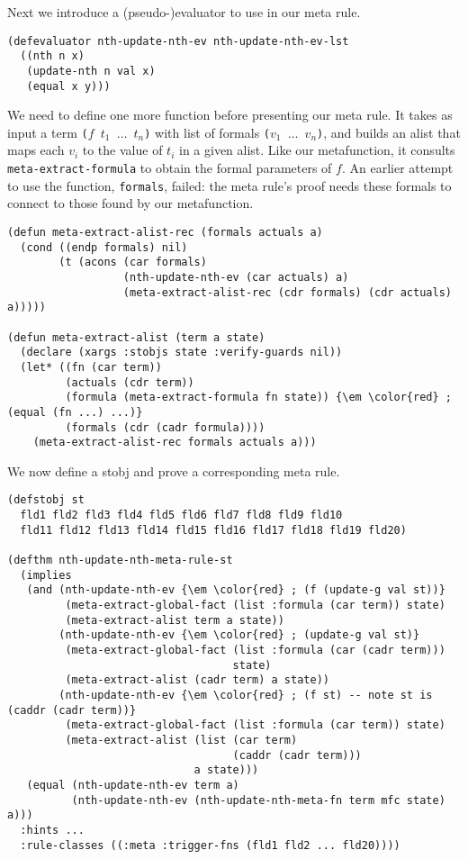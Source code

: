 Next we introduce a (pseudo-)evaluator to use in our meta rule.

\begin{verbatim}
(defevaluator nth-update-nth-ev nth-update-nth-ev-lst
  ((nth n x)
   (update-nth n val x)
   (equal x y)))
\end{verbatim}

We need to define one more function before presenting our meta rule.
It takes as input a term {\tt ($f$ $t_1$ $\ldots$ $t_n$)} with list of
formals {\tt ($v_1$ $\ldots$ $v_n$)}, and builds an alist that maps
each $v_i$ to the value of $t_i$ in a given alist.  Like our
metafunction, it consults {\tt meta-extract-formula} to obtain the
formal parameters of $f$.  An earlier attempt to use the function,
{\tt formals}, failed: the meta rule's proof needs these formals to
connect to those found by our metafunction.

\begin{Verbatim}[commandchars=\\\{\},fontsize=\small]
(defun meta-extract-alist-rec (formals actuals a)
  (cond ((endp formals) nil)
        (t (acons (car formals)
                  (nth-update-nth-ev (car actuals) a)
                  (meta-extract-alist-rec (cdr formals) (cdr actuals) a)))))

(defun meta-extract-alist (term a state)
  (declare (xargs :stobjs state :verify-guards nil))
  (let* ((fn (car term))
         (actuals (cdr term))
         (formula (meta-extract-formula fn state)) {\em \color{red} ; (equal (fn ...) ...)}
         (formals (cdr (cadr formula))))
    (meta-extract-alist-rec formals actuals a)))
\end{Verbatim}

\noindent We now define a stobj and prove a corresponding meta rule.

\begin{Verbatim}[commandchars=\\\{\},fontsize=\small]
(defstobj st
  fld1 fld2 fld3 fld4 fld5 fld6 fld7 fld8 fld9 fld10
  fld11 fld12 fld13 fld14 fld15 fld16 fld17 fld18 fld19 fld20)

(defthm nth-update-nth-meta-rule-st
  (implies
   (and (nth-update-nth-ev {\em \color{red} ; (f (update-g val st))}
         (meta-extract-global-fact (list :formula (car term)) state)
         (meta-extract-alist term a state))
        (nth-update-nth-ev {\em \color{red} ; (update-g val st)}
         (meta-extract-global-fact (list :formula (car (cadr term)))
                                   state)
         (meta-extract-alist (cadr term) a state))
        (nth-update-nth-ev {\em \color{red} ; (f st) -- note st is (caddr (cadr term))}
         (meta-extract-global-fact (list :formula (car term)) state)
         (meta-extract-alist (list (car term)
                                   (caddr (cadr term)))
                             a state)))
   (equal (nth-update-nth-ev term a)
          (nth-update-nth-ev (nth-update-nth-meta-fn term mfc state) a)))
  :hints ...
  :rule-classes ((:meta :trigger-fns (fld1 fld2 ... fld20))))
\end{Verbatim}

